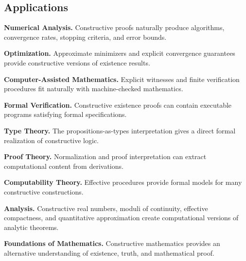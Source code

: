 \subsection{Applications}
\label{subsec:constructive-mathematics-applications}

\begin{applicationbox}

\textbf{Numerical Analysis.}
Constructive proofs naturally produce algorithms, convergence rates,
stopping criteria, and error bounds.

\medskip

\textbf{Optimization.}
Approximate minimizers and explicit convergence guarantees provide
constructive versions of existence results.

\medskip

\textbf{Computer-Assisted Mathematics.}
Explicit witnesses and finite verification procedures fit naturally with
machine-checked mathematics.

\medskip

\textbf{Formal Verification.}
Constructive existence proofs can contain executable programs satisfying
formal specifications.

\medskip

\textbf{Type Theory.}
The propositions-as-types interpretation gives a direct formal realization
of constructive logic.

\medskip

\textbf{Proof Theory.}
Normalization and proof interpretation can extract computational content
from derivations.

\medskip

\textbf{Computability Theory.}
Effective procedures provide formal models for many constructive
constructions.

\medskip

\textbf{Analysis.}
Constructive real numbers, moduli of continuity, effective compactness, and
quantitative approximation create computational versions of analytic
theorems.

\medskip

\textbf{Foundations of Mathematics.}
Constructive mathematics provides an alternative understanding of
existence, truth, and mathematical proof.

\end{applicationbox}


